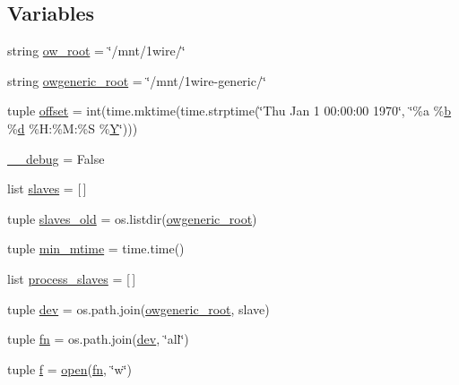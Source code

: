 \subsection*{Variables}
\begin{DoxyCompactItemize}
\item 
string \hyperlink{namespaceowgeneric__arduino_acf1b83c6bfca7dce8e079086078b19b9}{ow\-\_\-root} = \char`\"{}/mnt/1wire/\char`\"{}
\item 
string \hyperlink{namespaceowgeneric__arduino_a55174673236c57dac9b691a2f5b49b69}{owgeneric\-\_\-root} = \char`\"{}/mnt/1wire-\/generic/\char`\"{}
\item 
tuple \hyperlink{namespaceowgeneric__arduino_a30145d36e9de440b44c360e2c295e4aa}{offset} = int(time.\-mktime(time.\-strptime(\char`\"{}Thu Jan 1 00\-:00\-:00 1970\char`\"{}, \char`\"{}\%a \%\hyperlink{IMU_8cpp_a20f3a6e8a2ba2537edf801801628417b}{b} \%\hyperlink{OWGeneric__DangerShield_8ino_a22871ee78191bcd7676a38358795104e}{d} \%H\-:\%M\-:\%S \%\hyperlink{OWGeneric__SensorStation_8ino_ac915220fb659eb2c5958a1ccd81b80d4}{Y}\char`\"{})))
\item 
\hyperlink{namespaceowgeneric__arduino_abdc14696f564f9b8ed10fa1816940639}{\-\_\-\-\_\-debug} = False
\item 
list \hyperlink{namespaceowgeneric__arduino_a2c230abaed3d21deb7b84292cf219ed6}{slaves} = \mbox{[}$\,$\mbox{]}
\item 
tuple \hyperlink{namespaceowgeneric__arduino_a8185d7d521265a9dfca0cc8a8b75c718}{slaves\-\_\-old} = os.\-listdir(\hyperlink{namespaceowgeneric__arduino_a55174673236c57dac9b691a2f5b49b69}{owgeneric\-\_\-root})
\item 
tuple \hyperlink{namespaceowgeneric__arduino_ae35375aa69efe1f0333b7a86c6d4e8dd}{min\-\_\-mtime} = time.\-time()
\item 
list \hyperlink{namespaceowgeneric__arduino_a88e87453974fbe548a91bf0884be4ad3}{process\-\_\-slaves} = \mbox{[}$\,$\mbox{]}
\item 
tuple \hyperlink{namespaceowgeneric__arduino_a49246b75ead314904c32e0e686bb8248}{dev} = os.\-path.\-join(\hyperlink{namespaceowgeneric__arduino_a55174673236c57dac9b691a2f5b49b69}{owgeneric\-\_\-root}, slave)
\item 
tuple \hyperlink{namespaceowgeneric__arduino_a46bffb5615da79637d8d6cbebd45dcdc}{fn} = os.\-path.\-join(\hyperlink{namespaceowgeneric__arduino_a49246b75ead314904c32e0e686bb8248}{dev}, \char`\"{}all\char`\"{})
\item 
tuple \hyperlink{namespaceowgeneric__arduino_a56ab65883376573ac79e173c4be17f36}{f} = \hyperlink{term_8js_a1a542444e56cda6325863b2dde2a2f6e}{open}(\hyperlink{namespaceowgeneric__arduino_a46bffb5615da79637d8d6cbebd45dcdc}{fn}, \char`\"{}w\char`\"{})

\end{DoxyCompactItemize}
